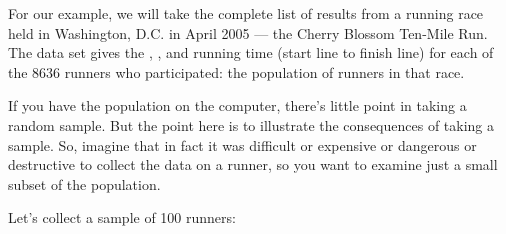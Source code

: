For our example, we will take the complete list of results from a
running race held in Washington, D.C. in April 2005 --- the Cherry
Blossom Ten-Mile Run.  
The data set gives the , , and  running time
(start line to finish line) for each of the 8636 runners who
participated: the population of runners in that race.

\begin{knitrout}
\end{knitrout}


If you have the population on the computer, there's little point
in taking a random sample.  But the point here is to illustrate the
consequences of taking a sample.  So, imagine that in fact it was
difficult or expensive or dangerous or destructive to collect the data on a runner,
so you want to examine just a small subset of the population.

Let's collect a sample of 100 runners:
\begin{knitrout}
\end{knitrout}


